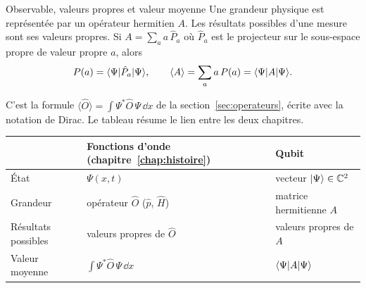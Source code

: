 \begin{resultat}{Observable, valeurs propres et valeur moyenne}
Une grandeur physique est représentée par un opérateur hermitien $A$. Les résultats possibles d'une
mesure sont ses valeurs propres. Si $A=\sum_a a\,\hat P_a$ où $\hat P_a$ est le projecteur sur le
sous-espace propre de valeur propre $a$, alors
\[
  P(a)=\langle \Psi|\hat P_a|\Psi\rangle,\qquad
  \langle A\rangle=\sum_a a\,P(a)=\langle \Psi|A|\Psi\rangle.
\]
\end{resultat}

C'est la formule $\langle\hat O\rangle=\int\Psi^*\hat O\,\Psi\,\dd x$ de la
section~\ref{sec:operateurs}, écrite avec la notation de Dirac. Le tableau résume le lien entre
les deux chapitres.

\begin{center}
\renewcommand{\arraystretch}{1.4}
\begin{tabular}{@{}l l l@{}}
\toprule
 & \textbf{Fonctions d'onde (chapitre~\ref{chap:histoire})} & \textbf{Qubit} \\
\midrule
État & $\Psi(x,t)$ & vecteur $|\Psi\rangle\in\mathbb{C}^2$ \\
Grandeur & opérateur $\hat O$ ($\hat p$, $\hat H$) & matrice hermitienne $A$ \\
Résultats possibles & valeurs propres de $\hat O$ & valeurs propres de $A$ \\
Valeur moyenne & $\int\Psi^*\hat O\,\Psi\,\dd x$ & $\langle \Psi|A|\Psi\rangle$ \\
\bottomrule
\end{tabular}
\end{center}


